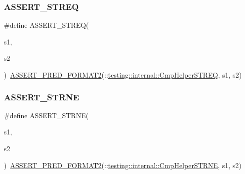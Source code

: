 \subsubsection{\texorpdfstring{ASSERT\_STREQ}{ASSERT\_STREQ}}
{\footnotesize\ttfamily \#define A\+S\+S\+E\+R\+T\+\_\+\+S\+T\+R\+EQ(\begin{DoxyParamCaption}\item[{}]{s1,  }\item[{}]{s2 }\end{DoxyParamCaption})~\mbox{\hyperlink{_obj__test_2lib_2googletest-release-1_88_81_2googletest_2include_2gtest_2gtest__pred__impl_8h_ac452685a1a98ea3d96eb956a062ee210}{A\+S\+S\+E\+R\+T\+\_\+\+P\+R\+E\+D\+\_\+\+F\+O\+R\+M\+A\+T2}}(\+::\mbox{\hyperlink{namespacetesting_1_1internal_a711a396ed8f636ecd14a850a89d181b6}{testing\+::internal\+::\+Cmp\+Helper\+S\+T\+R\+EQ}}, s1, s2)}

\mbox{\label{_obj__test_2lib_2googletest-master_2googletest_2include_2gtest_2gtest_8h_a3d679660ac1b2f9f6e6c7608452af923}} 
\subsubsection{\texorpdfstring{ASSERT\_STRNE}{ASSERT\_STRNE}}
{\footnotesize\ttfamily \#define A\+S\+S\+E\+R\+T\+\_\+\+S\+T\+R\+NE(\begin{DoxyParamCaption}\item[{}]{s1,  }\item[{}]{s2 }\end{DoxyParamCaption})~\mbox{\hyperlink{_obj__test_2lib_2googletest-release-1_88_81_2googletest_2include_2gtest_2gtest__pred__impl_8h_ac452685a1a98ea3d96eb956a062ee210}{A\+S\+S\+E\+R\+T\+\_\+\+P\+R\+E\+D\+\_\+\+F\+O\+R\+M\+A\+T2}}(\+::\mbox{\hyperlink{namespacetesting_1_1internal_af2d31c77ce73e1003a64bd7ca3564bbe}{testing\+::internal\+::\+Cmp\+Helper\+S\+T\+R\+NE}}, s1, s2)}

\mbox{\label{_obj__test_2lib_2googletest-master_2googletest_2include_2gtest_2gtest_8h_aedb1eddae6c2a2430b0e7b7e03b4f052}} 

